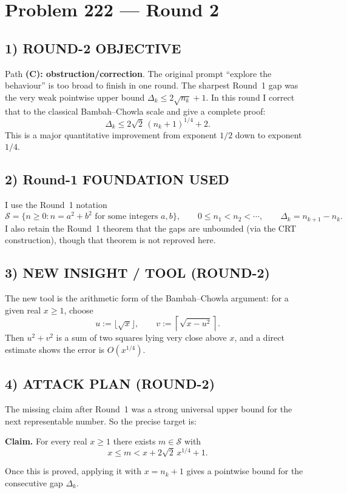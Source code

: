 \section*{Problem 222 --- Round 2}

\subsection*{1) ROUND-2 OBJECTIVE}
Path \textbf{(C): obstruction/correction}.  The original prompt ``explore the behaviour'' is too broad to finish in one round.  The sharpest Round~1 gap was the very weak pointwise upper bound $\Delta_k\le 2\sqrt{n_k}+1$.  In this round I correct that to the classical Bambah--Chowla scale and give a complete proof:
\[
\Delta_k \le 2\sqrt{2}\,(n_k+1)^{1/4}+2.
\]
This is a major quantitative improvement from exponent $1/2$ down to exponent $1/4$.

\subsection*{2) Round-1 FOUNDATION USED}
I use the Round~1 notation
\[
\mathcal S=\{n\ge 0:n=a^2+b^2\mbox{ for some integers }a,b\},
\qquad
0\le n_1<n_2<\cdots,
\qquad
\Delta_k=n_{k+1}-n_k.
\]
I also retain the Round~1 theorem that the gaps are unbounded (via the CRT construction), though that theorem is not reproved here.

\subsection*{3) NEW INSIGHT / TOOL (ROUND-2)}
The new tool is the arithmetic form of the Bambah--Chowla argument: for a given real $x\ge 1$, choose
\[
u:=\lfloor \sqrt{x}\rfloor,
\qquad
v:=\left\lceil \sqrt{x-u^2}\right\rceil.
\]
Then $u^2+v^2$ is a sum of two squares lying very close above $x$, and a direct estimate shows the error is $O(x^{1/4})$.

\subsection*{4) ATTACK PLAN (ROUND-2)}
The missing claim after Round~1 was a strong universal upper bound for the next representable number.  So the precise target is:

\medskip
\noindent\textbf{Claim.} For every real $x\ge 1$ there exists $m\in\mathcal S$ with
\[
x\le m < x+2\sqrt{2}\,x^{1/4}+1.
\]

Once this is proved, applying it with $x=n_k+1$ gives a pointwise bound for the consecutive gap $\Delta_k$.

